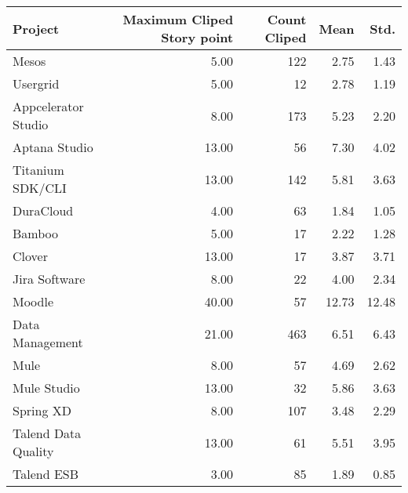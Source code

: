 \begin{tabular}{lrrrr}
\toprule
             Project &  Maximum Cliped Story point &  Count Cliped &  Mean &  Std. \\
\midrule
               Mesos &                        5.00 &           122 &  2.75 &  1.43 \\
            Usergrid &                        5.00 &            12 &  2.78 &  1.19 \\
 Appcelerator Studio &                        8.00 &           173 &  5.23 &  2.20 \\
       Aptana Studio &                       13.00 &            56 &  7.30 &  4.02 \\
    Titanium SDK/CLI &                       13.00 &           142 &  5.81 &  3.63 \\
           DuraCloud &                        4.00 &            63 &  1.84 &  1.05 \\
              Bamboo &                        5.00 &            17 &  2.22 &  1.28 \\
              Clover &                       13.00 &            17 &  3.87 &  3.71 \\
       Jira Software &                        8.00 &            22 &  4.00 &  2.34 \\
              Moodle &                       40.00 &            57 & 12.73 & 12.48 \\
     Data Management &                       21.00 &           463 &  6.51 &  6.43 \\
                Mule &                        8.00 &            57 &  4.69 &  2.62 \\
         Mule Studio &                       13.00 &            32 &  5.86 &  3.63 \\
           Spring XD &                        8.00 &           107 &  3.48 &  2.29 \\
 Talend Data Quality &                       13.00 &            61 &  5.51 &  3.95 \\
          Talend ESB &                        3.00 &            85 &  1.89 &  0.85 \\
\bottomrule
\end{tabular}

